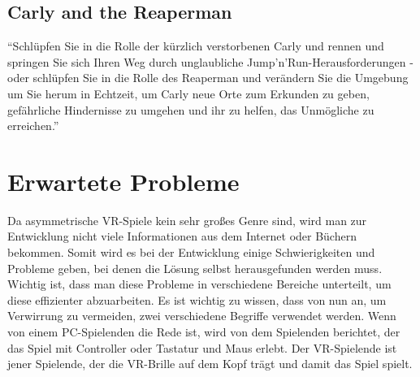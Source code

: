 \subsection{Carly and the Reaperman}
"`Schlüpfen Sie in die Rolle der kürzlich verstorbenen Carly und rennen und springen Sie sich Ihren Weg durch unglaubliche Jump'n'Run-Herausforderungen - oder schlüpfen Sie in die Rolle des Reaperman und verändern Sie die Umgebung um Sie herum in Echtzeit, um Carly neue Orte zum Erkunden zu geben, gefährliche Hindernisse zu umgehen und ihr zu helfen, das Unmögliche zu erreichen."'
\cite{_steam_carly}

\section{Erwartete Probleme}
Da asymmetrische VR-Spiele kein sehr großes Genre sind, wird man zur Entwicklung nicht viele Informationen aus dem Internet oder Büchern bekommen. Somit wird es bei der Entwicklung einige Schwierigkeiten und Probleme geben, bei denen die Lösung selbst herausgefunden werden muss. Wichtig ist, dass man diese Probleme in verschiedene Bereiche unterteilt, um diese effizienter abzuarbeiten. Es ist wichtig zu wissen, dass von nun an, um Verwirrung zu vermeiden, zwei verschiedene Begriffe verwendet werden. Wenn von einem PC-Spielenden die Rede ist, wird von dem Spielenden berichtet, der das Spiel mit Controller oder Tastatur und Maus erlebt. Der VR-Spielende ist jener Spielende, der die VR-Brille auf dem Kopf trägt und damit das Spiel spielt.
\cite{_motionsickness}
\cite{_vr_quovadis}

